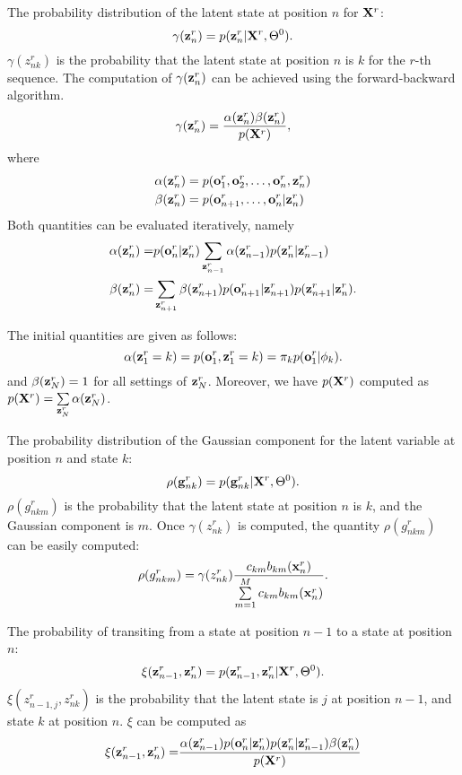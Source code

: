 The probability distribution of the latent state at position $n$ for $\mathbf{X}^r$:
$$
\gamma(\mathbf{z}_n^r) = p(\mathbf{z}_n^r | \mathbf{X}^r, \Theta^0).
$$
$\gamma(z_{nk}^r)$ is the probability that the latent state at
position $n$ is $k$ for the $r$-th sequence.  The computation of
$\gamma(\mathbf{z}_{n}^r)$ can be achieved using the forward-backward algorithm.
$$
\gamma(\mathbf{z}_n^r) = \frac{\alpha(\mathbf{z}_n^r) \beta(\mathbf{z}_n^r)}{p(\mathbf{X}^r)},
$$
where 
\begin{align*}
  \alpha(\mathbf{z}_n^r)  & =  p(\mathbf{o}_1^r, \mathbf{o}_2^r, \ldots, \mathbf{o}_n^r, \mathbf{z}_n^r) \\
  \beta(\mathbf{z}_n^r)  & =  p(\mathbf{o}_{n+1}^r, \ldots, \mathbf{o}_n^r | \mathbf{z}_n^r)
\end{align*}
Both quantities can be evaluated iteratively, namely
\begin{align*}
\alpha(\mathbf{z}_n^r) = & p(\mathbf{o}_n^r | \mathbf{z}_n^r) \sum\limits_{\mathbf{z}_{n-1}^r} \alpha(\mathbf{z}_{n-1}^r) p(\mathbf{z}_n^r | \mathbf{z}_{n-1}^r) \\
\beta(\mathbf{z}_n^r) = & \sum\limits_{\mathbf{z}_{n+1}^r} \beta(\mathbf{z}_{n+1}^r) p(\mathbf{o}_{n+1}^r | \mathbf{z}_{n+1}^r) p(\mathbf{z}_{n+1}^r | \mathbf{z}_{n}^r).
\end{align*}

The initial quantities are given as follows:
$$
\alpha(\mathbf{z}_1^r = k) = p(\mathbf{o}_1^r, \mathbf{z}_1^r=k) = \pi_k p(\mathbf{o}_1^r | \phi_k).
$$
and
$
\beta(\mathbf{z}_N^r) = 1
$
for all settings of $\mathbf{z}_N^r$.
Moreover, we have $p(\mathbf{X}^r)$ computed as $p(\mathbf{X}^r) = \sum\limits_{\mathbf{z}_N^r} \alpha(\mathbf{z}_N^r)$.

The probability distribution of the Gaussian component for the latent
variable at position $n$ and state $k$:
$$
\rho(\mathbf{g}_{nk}^r) = p(\mathbf{g}_{nk}^r | \mathbf{X}^r, \Theta^0).
$$
$\rho(g_{nkm}^r)$ is the probability
that the latent state at position $n$ is $k$, and the Gaussian component is $m$.
Once $\gamma(z_{nk}^r)$ is computed, the quantity $\rho(g_{nkm}^r)$ can be easily computed:
$$
\rho(g_{nkm}^r) = \gamma(z_{nk}^r) \frac{c_{km} b_{km}(\mathbf{x}_n^r)}{\sum\limits_{m=1}^M c_{km} b_{km}(\mathbf{x}_n^r)}.
$$


The probability of transiting from a state at position $n-1$ to a
state at position $n$:
$$
\xi(\mathbf{z}_{n-1}^r, \mathbf{z}_n^r) = p(\mathbf{z}_{n-1}^r, \mathbf{z}_n^r | \mathbf{X}^r, \Theta^0).
$$
$\xi(z_{n-1, j}^r, z_{nk}^r)$ is the
probability that the latent state is $j$ at position $n-1$, and state $k$ at
position $n$.  $ \xi$ can be computed as 
\begin{align*}
\xi(\mathbf{z}_{n-1}^r, \mathbf{z}_n^r) = 
& \frac{\alpha(\mathbf{z}_{n-1}^r) p(\mathbf{o}_n^r | \mathbf{z}_n^r) p(\mathbf{z}_n^r | \mathbf{z}_{n-1}^r) \beta(\mathbf{z}_n^r)}
{p(\mathbf{X}^r)} \\
\end{align*}


